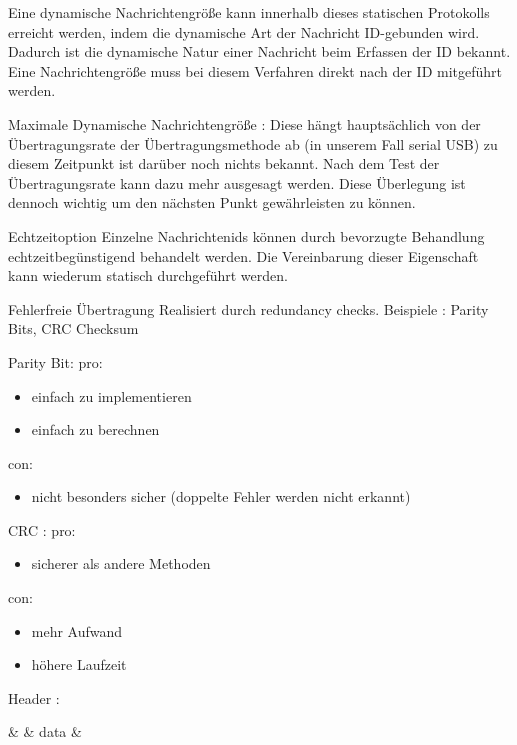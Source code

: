 Eine dynamische Nachrichtengröße kann innerhalb dieses statischen Protokolls erreicht werden, indem die dynamische Art der Nachricht ID-gebunden wird. Dadurch ist die dynamische Natur einer Nachricht beim Erfassen der ID bekannt. Eine Nachrichtengröße muss bei diesem Verfahren direkt nach der ID mitgeführt werden.

Maximale Dynamische Nachrichtengröße : Diese hängt hauptsächlich von der Übertragungsrate der Übertragungsmethode ab (in unserem Fall serial USB) zu diesem Zeitpunkt ist darüber noch nichts bekannt. Nach dem Test der Übertragungsrate kann dazu mehr ausgesagt werden. Diese Überlegung ist dennoch wichtig um den nächsten Punkt gewährleisten zu können.

\Large Echtzeitoption
\normalsize
Einzelne Nachrichtenids können durch bevorzugte Behandlung echtzeitbegünstigend behandelt werden. Die Vereinbarung dieser Eigenschaft kann wiederum statisch durchgeführt werden.

\Large Fehlerfreie Übertragung
Realisiert durch redundancy checks. Beispiele : Parity Bits, CRC Checksum

Parity Bit:
pro:
\begin{itemize}
	\item einfach zu implementieren
	\item einfach zu berechnen
\end{itemize}
con:
\begin{itemize}
	\item nicht besonders sicher (doppelte Fehler werden nicht erkannt)
\end{itemize}

CRC :
pro:
\begin{itemize}
	\item sicherer als andere Methoden
\end{itemize}
con:
\begin{itemize}
	unter Umständen ist zur Realisierung mehr Code nötig, woraus folgt
	\item mehr Aufwand
	\item höhere Laufzeit
\end{itemize}

\LARGE Header :
\normalsize
\begin{itemize}

\begin{bytefield}[bitwidth=1.1em][64]
	 &  &  {data} & 
\end{bytefield}

\end{itemize}

